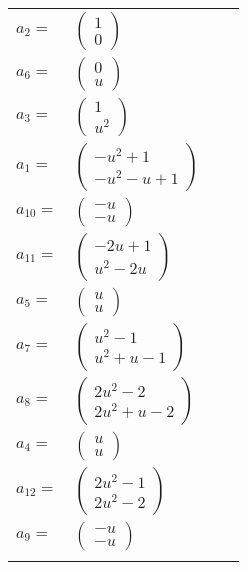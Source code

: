 \documentclass[1p]{elsarticle_modified}
\theoremstyle{definition}
\begin{document}
\begin{tabular}{m{7pt} m{180pt} m{7pt} m{180pt} }
\flushright $a_{2}=$&$\begin{pmatrix}1\\0\end{pmatrix}$ \\
\flushright $a_{6}=$&$\begin{pmatrix}0\\u\end{pmatrix}$ \\
\flushright $a_{3}=$&$\begin{pmatrix}1\\u^2\end{pmatrix}$ \\
\flushright $a_{1}=$&$\begin{pmatrix}- u^2+1\\- u^2- u+1\end{pmatrix}$ \\
\flushright $a_{10}=$&$\begin{pmatrix}- u\\- u\end{pmatrix}$ \\
\flushright $a_{11}=$&$\begin{pmatrix}-2 u+1\\u^2-2 u\end{pmatrix}$ \\
\flushright $a_{5}=$&$\begin{pmatrix}u\\u\end{pmatrix}$ \\
\flushright $a_{7}=$&$\begin{pmatrix}u^2-1\\u^2+u-1\end{pmatrix}$ \\
\flushright $a_{8}=$&$\begin{pmatrix}2 u^2-2\\2 u^2+u-2\end{pmatrix}$ \\
\flushright $a_{4}=$&$\begin{pmatrix}u\\u\end{pmatrix}$ \\
\flushright $a_{12}=$&$\begin{pmatrix}2 u^2-1\\2 u^2-2\end{pmatrix}$ \\
\flushright $a_{9}=$&$\begin{pmatrix}- u\\- u\end{pmatrix}$\\&\end{tabular}
\end{document}
